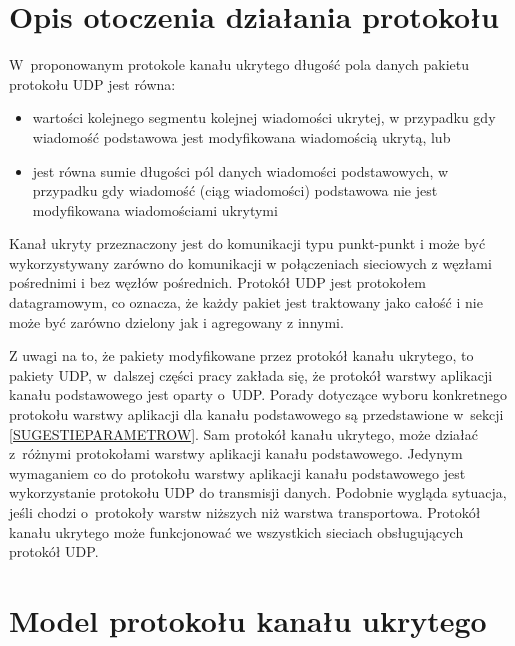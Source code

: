 \documentclass[a4paper, twoside, openright, 12pt]{report}
\begin{document}
    \section{Opis otoczenia działania protokołu}
    W~proponowanym protokole kanału ukrytego długość pola danych pakietu protokołu UDP
    jest równa:
    \begin{itemize}
        \item wartości kolejnego segmentu kolejnej wiadomości ukrytej, w przypadku
            gdy wiadomość podstawowa jest modyfikowana wiadomością ukrytą, lub
        \item jest równa sumie długości pól danych wiadomości podstawowych, w przypadku
            gdy wiadomość (ciąg wiadomości) podstawowa nie jest modyfikowana wiadomościami
            ukrytymi
    \end{itemize}
    Kanał ukryty przeznaczony jest do komunikacji typu punkt-punkt i może być
    wykorzystywany zarówno do komunikacji w połączeniach sieciowych z węzłami
    pośrednimi i bez węzłów pośrednich. Protokół UDP jest protokołem datagramowym, co
    oznacza, że każdy pakiet jest traktowany jako całość i nie może
    być zarówno dzielony jak i agregowany z innymi.

    Z uwagi na to, że pakiety modyfikowane przez protokół kanału ukrytego, to pakiety UDP,
    w~dalszej części pracy zakłada się, że protokół warstwy aplikacji kanału podstawowego jest oparty o~UDP.
    Porady dotyczące wyboru konkretnego protokołu warstwy aplikacji dla
    kanału podstawowego są przedstawione w~sekcji \ref{SUGESTIEPARAMETROW}. Sam protokół kanału
    ukrytego, może działać z~różnymi protokołami warstwy aplikacji kanału podstawowego.
    Jedynym wymaganiem co do protokołu warstwy aplikacji kanału podstawowego
    jest wykorzystanie protokołu UDP do transmisji danych. Podobnie wygląda sytuacja,
    jeśli chodzi o~protokoły warstw niższych niż warstwa transportowa. Protokół kanału
    ukrytego może funkcjonować we wszystkich sieciach obsługujących protokół UDP.

    \section{Model protokołu kanału ukrytego}
\end{document}
